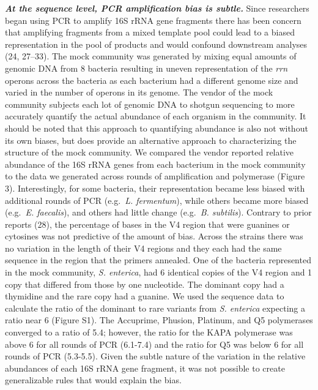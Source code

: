 \documentclass[11pt,]{article}
\begin{document}
\textbf{\emph{At the sequence level, PCR amplification bias is subtle.}}
Since researchers began using PCR to amplify 16S rRNA gene fragments
there has been concern that amplifying fragments from a mixed template
pool could lead to a biased representation in the pool of products and
would confound downstream analyses (24, 27--33). The mock community was
generated by mixing equal amounts of genomic DNA from 8 bacteria
resulting in uneven representation of the \emph{rrn} operons across the
bacteria as each bacterium had a different genome size and varied in the
number of operons in its genome. The vendor of the mock community
subjects each lot of genomic DNA to shotgun sequencing to more
accurately quantify the actual abundance of each organism in the
community. It should be noted that this approach to quantifying
abundance is also not without its own biases, but does provide an
alternative approach to characterizing the structure of the mock
community. We compared the vendor reported relative abundance of the 16S
rRNA genes from each bacterium in the mock community to the data we
generated across rounds of amplification and polymerase (Figure 3).
Interestingly, for some bacteria, their representation became less
biased with additional rounds of PCR (e.g.~\emph{L. fermentum}), while
others became more biased (e.g.~\emph{E. faecalis}), and others had
little change (e.g.~\emph{B. subtilis}). Contrary to prior reports (28),
the percentage of bases in the V4 region that were guanines or cytosines
was not predictive of the amount of bias. Across the strains there was
no variation in the length of their V4 regions and they each had the
same sequence in the region that the primers annealed. One of the
bacteria represented in the mock community, \emph{S. enterica}, had 6
identical copies of the V4 region and 1 copy that differed from those by
one nucleotide. The dominant copy had a thymidine and the rare copy had
a guanine. We used the sequence data to calculate the ratio of the
dominant to rare variants from \emph{S. enterica} expecting a ratio near
6 (Figure S1). The Accuprime, Phusion, Platinum, and Q5 polymerases
converged to a ratio of 5.4; however, the ratio for the KAPA polymerase
was above 6 for all rounds of PCR (6.1-7.4) and the ratio for Q5 was
below 6 for all rounds of PCR (5.3-5.5). Given the subtle nature of the
variation in the relative abundances of each 16S rRNA gene fragment, it
was not possible to create generalizable rules that would explain the
bias.
\end{document}
